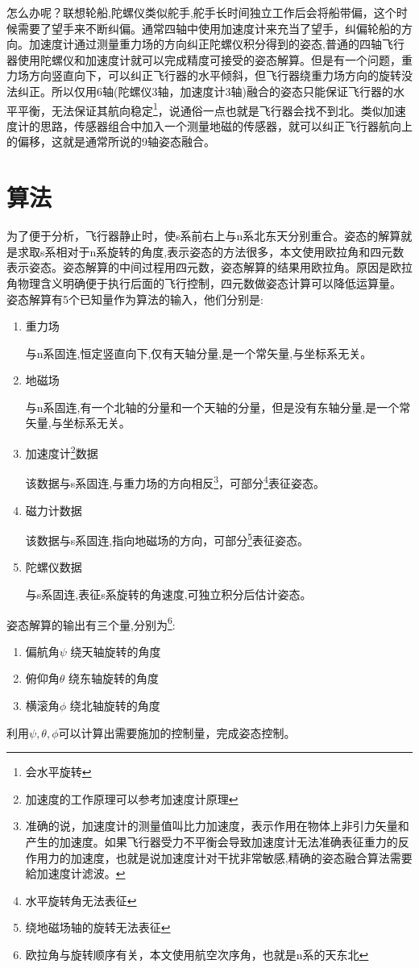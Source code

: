 \documentclass[12pt,a4paper]{article}
\begin{document}
怎么办呢？\cite{9轴融合论文}联想轮船,陀螺仪类似舵手,舵手长时间独立工作后会将船带偏，这个时候需要了望手来不断纠偏。通常四轴中使用加速度计来充当了望手，纠偏轮船的方向。加速度计通过测量重力场的方向纠正陀螺仪积分得到的姿态,普通的四轴飞行器使用陀螺仪和加速度计就可以完成精度可接受的姿态解算。但是有一个问题，重力场方向竖直向下，可以纠正飞行器的水平倾斜，但飞行器绕重力场方向的旋转没法纠正。所以仅用6轴(陀螺仪3轴，加速度计3轴)融合的姿态只能保证飞行器的水平平衡，无法保证其航向稳定\footnote{会水平旋转}，说通俗一点也就是飞行器会找不到北。类似加速度计的思路，传感器组合中加入一个测量地磁的传感器\cite{经典博客}，就可以纠正飞行器航向上的偏移，这就是通常所说的9轴姿态融合。

\section{算法}
为了便于分析，飞行器静止时，使s系前右上与n系北东天分别重合。姿态的解算就是求取s系相对于n系旋转的角度,表示姿态的方法很多，本文使用欧拉角和四元数表示姿态。姿态解算的中间过程用四元数，姿态解算的结果用欧拉角。原因是欧拉角物理含义明确便于执行后面的飞行控制，四元数做姿态计算可以降低运算量。
姿态解算有5个已知量作为算法的输入，他们分别是:
\begin{enumerate}
    \item 重力场

        与n系固连,恒定竖直向下,仅有天轴分量,是一个常矢量,与坐标系无关。
    \item 地磁场

        与n系固连,有一个北轴的分量和一个天轴的分量，但是没有东轴分量,是一个常矢量,与坐标系无关。
    \item 加速度计\footnote{加速度的工作原理可以参考加速度计原理\cite{加速度计原理}}数据

        该数据与s系固连,与重力场的方向相反\footnote{准确的说，加速度计的测量值叫比力加速度，表示作用在物体上非引力矢量和产生的加速度。如果飞行器受力不平衡会导致加速度计无法准确表征重力的反作用力的加速度，也就是说加速度计对干扰非常敏感,精确的姿态融合算法需要給加速度计滤波。}，可部分\footnote{水平旋转角无法表征}表征姿态。
    \item 磁力计数据

        该数据与s系固连,指向地磁场的方向，可部分\footnote{绕地磁场轴的旋转无法表征}表征姿态。
    \item 陀螺仪数据

        与s系固连,表征s系旋转的角速度,可独立积分后估计姿态。
\end{enumerate}
姿态解算的输出有三个量,分别为\footnote{欧拉角与旋转顺序有关，本文使用航空次序角，也就是n系的天东北}:
\begin{enumerate}
    \item 偏航角$\psi$
        绕天轴旋转的角度
    \item 俯仰角$\theta$
        绕东轴旋转的角度
    \item 横滚角$\phi$
        绕北轴旋转的角度
\end{enumerate}
利用$\psi,\theta,\phi$可以计算出需要施加的控制量，完成姿态控制。
\end{document}
